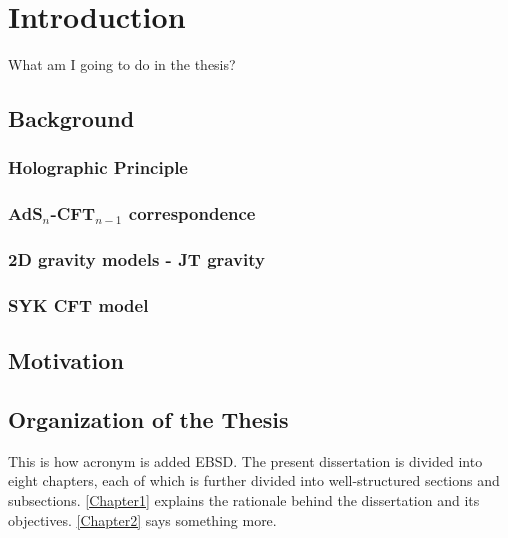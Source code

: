 
\chapter{Introduction} %

\label{Chapter1}



What am I going to do in the thesis?

\section{Background}

\subsection{Holographic Principle}

\subsection{AdS$_n$-CFT$_{n-1}$ correspondence}

\subsection{2D gravity models - JT gravity}

\subsection{SYK CFT model}


\section{Motivation}

\lipsum[2-4]

\section{Organization of the Thesis}

This is how acronym is added \ac{EBSD}. The present dissertation is divided into eight chapters, each of which is further divided into well-structured sections and subsections. \autoref{Chapter1} explains the rationale behind the dissertation and its objectives. \autoref{Chapter2} says something more. 

\lipsum[2-4]
